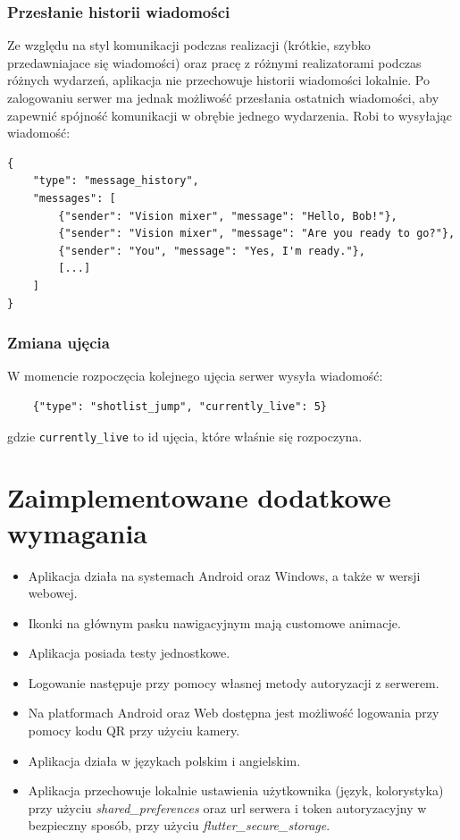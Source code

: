 \documentclass[11pt, letterpaper]{article}
\begin{document}
\subsubsection{Przesłanie historii wiadomości}
Ze względu na styl komunikacji podczas realizacji (krótkie, szybko przedawniajace się wiadomości) oraz pracę z różnymi realizatorami podczas różnych wydarzeń, aplikacja nie przechowuje historii wiadomości lokalnie. Po zalogowaniu serwer ma jednak możliwość przesłania ostatnich wiadomości, aby zapewnić spójność komunikacji w obrębie jednego wydarzenia. Robi to wysyłając wiadomość:
\begin{verbatim}
{
    "type": "message_history",
    "messages": [
        {"sender": "Vision mixer", "message": "Hello, Bob!"},
        {"sender": "Vision mixer", "message": "Are you ready to go?"},
        {"sender": "You", "message": "Yes, I'm ready."},
        [...]
    ]
}
\end{verbatim}


\subsubsection{Zmiana ujęcia}
W momencie rozpoczęcia kolejnego ujęcia serwer wysyła wiadomość:
\begin{verbatim}
    {"type": "shotlist_jump", "currently_live": 5}
\end{verbatim}
gdzie \texttt{currently\_live} to id ujęcia, które właśnie się rozpoczyna.


\section{Zaimplementowane dodatkowe wymagania}
\begin{itemize}
    \item Aplikacja działa na systemach Android oraz Windows, a także w wersji webowej.
    \item Ikonki na głównym pasku nawigacyjnym mają customowe animacje.
    \item Aplikacja posiada testy jednostkowe.
    \item Logowanie następuje przy pomocy własnej metody autoryzacji z serwerem.
    \item Na platformach Android oraz Web dostępna jest możliwość logowania przy pomocy kodu QR przy użyciu kamery.
    \item Aplikacja działa w językach polskim i angielskim.
    \item Aplikacja przechowuje lokalnie ustawienia użytkownika (język, kolorystyka) przy użyciu \textit{shared\_preferences} oraz url serwera i token autoryzacyjny w bezpieczny sposób, przy użyciu \textit{flutter\_secure\_storage}.
\end{itemize}
\end{document}
